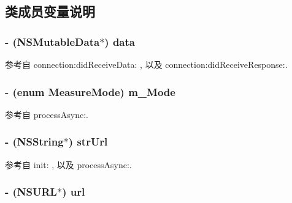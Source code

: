 \subsection{类成员变量说明}
\hypertarget{interface_r_m_s_m_measure_service_a3aae027c2610d827726c919e9650cec0}{
\subsubsection[{data}]{\setlength{\rightskip}{0pt plus 5cm}-\/ (N\-S\-Mutable\-Data$\ast$) data\hspace{0.3cm}{\ttfamily [protected]}}}\label{interface_r_m_s_m_measure_service_a3aae027c2610d827726c919e9650cec0}


参考自 connection\-:did\-Receive\-Data\-: , 以及 connection\-:did\-Receive\-Response\-:.

\hypertarget{interface_r_m_s_m_measure_service_ab04420fd34904023a05ac939a3e3df17}{
\subsubsection[{m\-\_\-\-Mode}]{\setlength{\rightskip}{0pt plus 5cm}-\/ (enum {\bf Measure\-Mode}) m\-\_\-\-Mode\hspace{0.3cm}{\ttfamily [protected]}}}\label{interface_r_m_s_m_measure_service_ab04420fd34904023a05ac939a3e3df17}


参考自 process\-Async\-:.

\hypertarget{interface_r_m_s_m_measure_service_a1fc5b2265daee2f7198461d6cca268b9}{
\subsubsection[{str\-Url}]{\setlength{\rightskip}{0pt plus 5cm}-\/ (N\-S\-String$\ast$) str\-Url\hspace{0.3cm}{\ttfamily [protected]}}}\label{interface_r_m_s_m_measure_service_a1fc5b2265daee2f7198461d6cca268b9}


参考自 init\-: , 以及 process\-Async\-:.

\hypertarget{interface_r_m_s_m_measure_service_a2b5b549e267bbddab147b5b7193be2df}{
\subsubsection[{url}]{\setlength{\rightskip}{0pt plus 5cm}-\/ (N\-S\-U\-R\-L$\ast$) url\hspace{0.3cm}{\ttfamily [protected]}}}\label{interface_r_m_s_m_measure_service_a2b5b549e267bbddab147b5b7193be2df}


